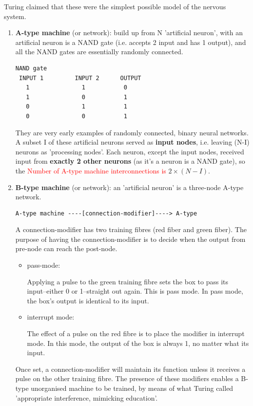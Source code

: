 Turing claimed that these were the simplest possible model of the nervous
system.
\begin{enumerate}
  \item {\bf A-type machine} (or network): build up from N 'artificial neuron',
  with an artificial neuron is a NAND gate (i.e. accepts 2 input and has 1
  output), and all the NAND gates are essentially randomly connected.

\begin{verbatim}
NAND gate
 INPUT 1         INPUT 2      OUTPUT
   1               1           0
   1               0           1
   0               1           1
   0               0           1
\end{verbatim}
They are very early examples of randomly connected, binary neural networks.
A subset I of these artificial neurons served as {\bf input nodes}, i.e.
leaving (N-I) neurons as 'processing nodes'. Each neuron, except the input
nodes, received input from {\bf exactly 2 other neurons} (as it's a neuron is a
NAND gate), so the \textcolor{red}{Number of A-type machine interconnections is}
$2\times(N-I)$.
  
  \item {\bf B-type machine} (or network): an 'artificial neuron' 
  is a three-node A-type network. 
\begin{verbatim}
A-type machine ----[connection-modifier]----> A-type
\end{verbatim}
A connection-modifier has two training fibres (red fiber and green fiber).
The purpose of having the connection-modifier is to decide when the output from
pre-node can reach the post-node. 

\begin{itemize}
  \item pass-mode:

Applying a pulse to the green training fibre sets the box to pass its
input--either 0 or 1--straight out again. This is pass mode. In pass mode, the
box's output is identical to its input. 
  
  \item interrupt mode: 

The effect of a pulse on the red fibre is to place the modifier in interrupt
mode. In this mode, the output of the box is always 1, no matter what its input. 

\end{itemize}
Once set, a connection-modifier will maintain its function unless it receives a
pulse on the other training fibre. The presence of these modifiers enables a B-type
unorganised machine to be trained, by means of what Turing called 'appropriate
interference, mimicking education'.



\end{enumerate}
